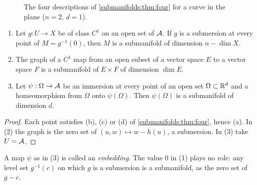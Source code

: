 \begin{notechapter}
\begin{figure}[ht]
\caption{The four descriptions of \cref{submanifolds:thm:four} for a
curve in the plane ($n = 2$, $d = 1$).}
\label{submanifolds:fig:four}
\end{figure}

\begin{corollary}
\label{submanifolds:cor:produce}
\begin{enumerate}[nosep]
  \item Let $g:U\to X$ be of class $C^1$ on an open set of $\mathcal{A}$. If $g$
        is a submersion at every point of $M = g^{-1}(0)$, then $M$ is a
        submanifold of dimension $n - \dim X$.
  \item The graph of a $C^1$ map from an open subset of a vector space
        $E$ to a vector space $F$ is a submanifold of $E\times F$ of
        dimension $\dim E$.
  \item Let $\psi:\Omega\to\mathcal{A}$ be an immersion at every point of an
        open set $\Omega\subset\mathbb{R}^d$ and a homeomorphism from $\Omega$
        onto $\psi(\Omega)$. Then $\psi(\Omega)$ is a submanifold of
        dimension $d$.
\end{enumerate}
\end{corollary}

\begin{proof}
Each point satisfies (b), (c) or (d) of \cref{submanifolds:thm:four},
hence (a). In (2) the graph is the zero set of $(u, w)\mapsto w - h(u)$,
a submersion. In (3) take $U = \mathcal{A}$.
\end{proof}

A map $\psi$ as in (3) is called an \emph{embedding}. The value $0$ in (1)
plays no role: any level set $g^{-1}(c)$ on which $g$ is a submersion is a
submanifold, as the zero set of $g - c$.


\end{notechapter}
